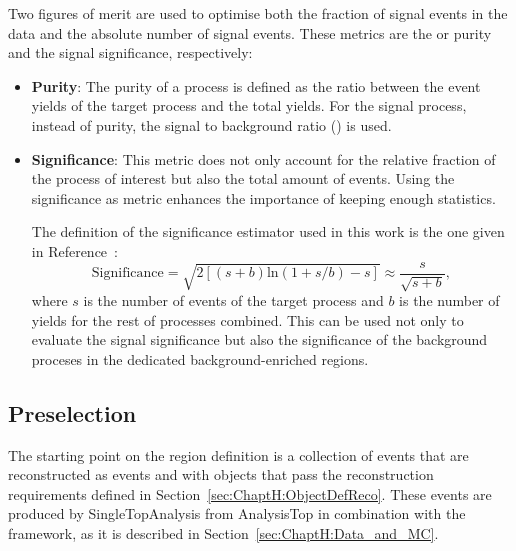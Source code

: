 Two figures of merit are used to optimise both the fraction of signal events in the data and the
absolute number of signal events. These metrics are the \StoB or purity and the signal significance,
respectively:
\begin{itemize}
\item \textbf{Purity}: 	The purity of a process is defined as the ratio between the 
				event yields of the target process and the total yields. For the signal process, 
				instead of purity, the signal to background ratio (\StoB) is used.
				
\item \textbf{Significance}:	This metric does not only account for the relative fraction of the
					process of interest but also the total amount of events. Using
					the significance as metric enhances the importance of keeping 
					enough statistics. 
					
					The definition of the significance estimator used in this work is
					the one given in Reference~\cite{Cowan:2010js}: %
					\begin{equation*}
						\text{Significance} = \sqrt{2 [(s+b) \text{ln}(1+s/b) - s]} \approx \frac{s}{\sqrt{s+b}},
					\end{equation*}
					where $s$ is the number of events of the target process 
					and $b$ is the number of yields for the rest of processes 
					combined. This can be used not only to evaluate the signal 
					significance but also the significance of the background proceses
					in the dedicated background-enriched regions.
\end{itemize}
			
\subsection{Preselection}
\label{sec:ChaptH:EventSelection:PR}
The starting point on the region definition is a collection of events 
that are reconstructed as \tHq events and with objects that
pass the reconstruction requirements defined in Section~\ref{sec:ChaptH:ObjectDefReco}.
These events
are produced by SingleTopAnalysis from AnalysisTop in combination with the
\thqloop framework, as it is described in Section~\ref{sec:ChaptH:Data_and_MC}.

